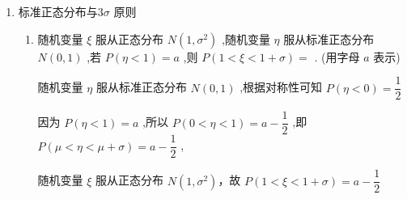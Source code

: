 \begin{enumerate}
\begin{enumerate}
\begin{jieda}
            当且仅当 $\left\{  \begin{array}{l} \dfrac{2 - x}{x} = \dfrac{4x}{2 - x} \\  0 < x < 2 \end{array}\right.$ 时,即当 $x = \dfrac{2}{3}$ 时,等号成立
        \end{jieda}
    \end{enumerate}
    \item 标准正态分布与${3\sigma }$ 原则
    \begin{enumerate}
        \item 随机变量 $\xi$ 服从正态分布 $N\left( {1,{\sigma }^{2}}\right)$ ,随机变量 $\eta$ 服从标准正态分布$N\left( {0,1}\right)$ ,若 $P\left( {\eta  < 1}\right) = a$ ,则 $P\left( {1 < \xi  < 1 + \sigma }\right)  =$ . (用字母 $a$ 表示)
        \begin{jieda}
            随机变量 $\eta$ 服从标准正态分布 $N\left( {0,1}\right)$ ,根据对称性可知 $P\left( {\eta  < 0}\right)  = \dfrac{1}{2}$
            
            因为 $P\left( {\eta  < 1}\right)  = a$ ,所以 $P\left( {0 < \eta  < 1}\right)  = a - \dfrac{1}{2}$ ,即 $P\left( {\mu  < \eta  < \mu  + \sigma }\right)  = a - \dfrac{1}{2}$ ,
            
            随机变量 $\xi$ 服从正态分布 $N\left( {1,{\sigma }^{2}}\right)$，故 $P\left( {1 < \xi  < 1 + \sigma }\right)  = a - \dfrac{1}{2}$
        \end{jieda}
        

\end{enumerate}
\end{enumerate}
